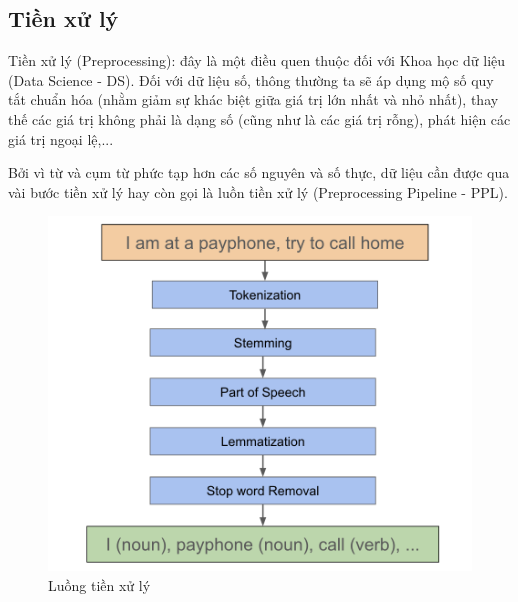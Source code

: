 \subsection{Tiền xử lý}
\label{preprocessing}
Tiền xử lý (Preprocessing): đây là một điều quen thuộc đối với Khoa học dữ liệu (Data Science - DS). Đối với dữ liệu số, thông thường ta sẽ áp dụng mộ số quy tắt chuẩn hóa (nhằm giảm sự khác biệt giữa giá trị lớn nhất và nhỏ nhất), thay thế các giá trị không phải là dạng số (cũng như là các giá trị rỗng), phát hiện các giá trị ngoại lệ,...

Bởi vì từ và cụm từ phức tạp hơn các số nguyên và số thực, dữ liệu cần được qua vài bước tiền xử lý hay còn gọi là luồn tiền xử lý (Preprocessing Pipeline - PPL).

\begin{figure}[h!]
\begin{center}
	\includegraphics[width=1.0\textwidth]{books/artificial-neural-network/chapter04/figure/pre_processing.png}
	\caption{Luồng tiền xử lý}
	\label{fig:nlp-classic}
\end{center}
\end{figure}

